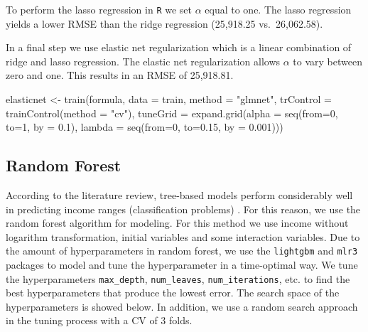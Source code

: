 \documentclass[11pt,a4paper]{article}
\newenvironment{Shaded}{\begin{snugshade}}{\end{snugshade}}
\newcommand{\AttributeTok}[1]{\textcolor[rgb]{0.77,0.63,0.00}{#1}}
\newcommand{\DecValTok}[1]{\textcolor[rgb]{0.00,0.00,0.81}{#1}}
\newcommand{\FloatTok}[1]{\textcolor[rgb]{0.00,0.00,0.81}{#1}}
\newcommand{\FunctionTok}[1]{\textcolor[rgb]{0.00,0.00,0.00}{#1}}
\newcommand{\NormalTok}[1]{#1}
\newcommand{\OtherTok}[1]{\textcolor[rgb]{0.56,0.35,0.01}{#1}}
\newcommand{\StringTok}[1]{\textcolor[rgb]{0.31,0.60,0.02}{#1}}
\begin{document}
To perform the lasso regression in \texttt{R} we set \(\alpha\) equal to
one. The lasso regression yields a lower RMSE than the ridge regression
(25,918.25 vs.~26,062.58).

In a final step we use elastic net regularization which is a linear
combination of ridge and lasso regression. The elastic net
regularization allows \(\alpha\) to vary between zero and one. This
results in an RMSE of 25,918.81.

\begin{Shaded}
\begin{Highlighting}[]
\NormalTok{elasticnet }\OtherTok{\textless{}{-}} \FunctionTok{train}\NormalTok{(formula, }\AttributeTok{data =}\NormalTok{ train,}
       \AttributeTok{method =} \StringTok{"glmnet"}\NormalTok{, }\AttributeTok{trControl =} \FunctionTok{trainControl}\NormalTok{(}\AttributeTok{method =} \StringTok{"cv"}\NormalTok{),}
       \AttributeTok{tuneGrid =} \FunctionTok{expand.grid}\NormalTok{(}\AttributeTok{alpha =} \FunctionTok{seq}\NormalTok{(}\AttributeTok{from=}\DecValTok{0}\NormalTok{, }\AttributeTok{to=}\DecValTok{1}\NormalTok{, }\AttributeTok{by =} \FloatTok{0.1}\NormalTok{),}
       \AttributeTok{lambda =} \FunctionTok{seq}\NormalTok{(}\AttributeTok{from=}\DecValTok{0}\NormalTok{, }\AttributeTok{to=}\FloatTok{0.15}\NormalTok{, }\AttributeTok{by =} \FloatTok{0.001}\NormalTok{)))}
\end{Highlighting}
\end{Shaded}

\hypertarget{random-forest}{%
\subsection{Random Forest}\label{random-forest}}

According to the literature review, tree-based models perform
considerably well in predicting income ranges (classification problems)
\autocite{Chakrabarty2018}. For this reason, we use the random forest
algorithm for modeling. For this method we use income without logarithm
transformation, initial variables and some interaction variables. Due to
the amount of hyperparameters in random forest, we use the
\texttt{lightgbm} and \texttt{mlr3} packages to model and tune the
hyperparameter in a time-optimal way. We tune the hyperparameters
\texttt{max\_depth}, \texttt{num\_leaves}, \texttt{num\_iterations},
etc. to find the best hyperparameters that produce the lowest error. The
search space of the hyperparameters is showed below. In addition, we use
a random search approach in the tuning process with a CV of 3 folds.
\end{document}
